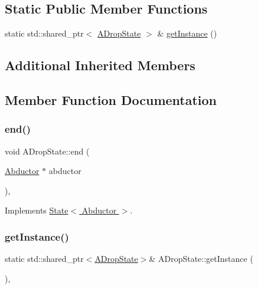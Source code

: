 \subsection*{Static Public Member Functions}
\begin{DoxyCompactItemize}
\item 
static std\+::shared\+\_\+ptr$<$ \hyperlink{class_a_drop_state}{A\+Drop\+State} $>$ \& \hyperlink{class_a_drop_state_a836c382a58447787d3c1518cccea8ebc}{get\+Instance} ()
\end{DoxyCompactItemize}
\subsection*{Additional Inherited Members}


\subsection{Member Function Documentation}
\mbox{\label{class_a_drop_state_a6af566dd1e06d425f16a69bbd11e811f}} 
\subsubsection{\texorpdfstring{end()}{end()}}
{\footnotesize\ttfamily void A\+Drop\+State\+::end (\begin{DoxyParamCaption}\item[{\hyperlink{class_abductor}{Abductor} $\ast$}]{abductor }\end{DoxyParamCaption})\hspace{0.3cm}{\ttfamily [override]}, {\ttfamily [virtual]}}



Implements \hyperlink{class_state_a97d058722f988c008e912a0e5ec879b3}{State$<$ Abductor $>$}.

\mbox{\label{class_a_drop_state_a836c382a58447787d3c1518cccea8ebc}} 
\subsubsection{\texorpdfstring{get\+Instance()}{getInstance()}}
{\footnotesize\ttfamily static std\+::shared\+\_\+ptr$<$\hyperlink{class_a_drop_state}{A\+Drop\+State}$>$\& A\+Drop\+State\+::get\+Instance (\begin{DoxyParamCaption}{ }\end{DoxyParamCaption})\hspace{0.3cm}{\ttfamily [inline]}, {\ttfamily [static]}}

